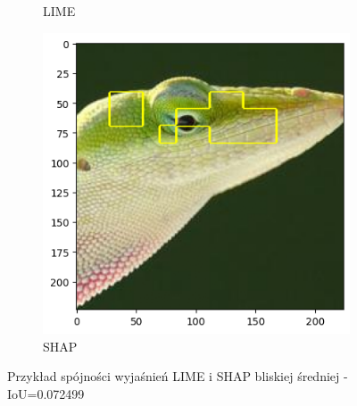 \begin{figure}[h]
\begin{subfigure}[b]{0.3\textwidth}
		\caption{LIME}  \label{}
	\end{subfigure}
	\begin{subfigure}[b]{0.3\textwidth}
		\centering\includegraphics[width=.9\textwidth]{img/examples/appendix/n01682714_14308_shap}
		\caption{SHAP}
	\end{subfigure}
	\caption{Przykład spójności wyjaśnień LIME i SHAP bliskiej średniej - IoU=0.072499}
	\label{}
\end{figure}

